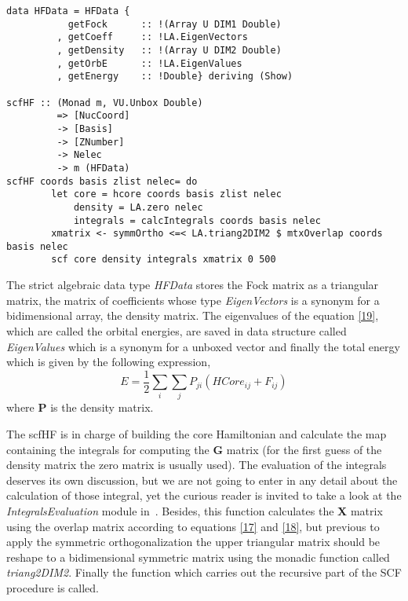 \documentclass{tmr}
\begin{document}
\begin{lstlisting}[float,captionpos=b,belowcaptionskip=4pt, caption= The Interface function]
data HFData = HFData {
           getFock      :: !(Array U DIM1 Double)
         , getCoeff     :: !LA.EigenVectors 
         , getDensity   :: !(Array U DIM2 Double)
         , getOrbE      :: !LA.EigenValues
         , getEnergy    :: !Double} deriving (Show)

scfHF :: (Monad m, VU.Unbox Double)
         => [NucCoord] 
         -> [Basis]
         -> [ZNumber]
         -> Nelec
         -> m (HFData)
scfHF coords basis zlist nelec= do 
        let core = hcore coords basis zlist nelec
            density = LA.zero nelec
            integrals = calcIntegrals coords basis nelec           
        xmatrix <- symmOrtho <=< LA.triang2DIM2 $ mtxOverlap coords basis nelec
        scf core density integrals xmatrix 0 500

\end{lstlisting}

The strict algebraic data type \textit{HFData} stores the Fock matrix as a triangular matrix, 
the matrix of coefficients whose type \textit{EigenVectors} is a synonym for a bidimensional array,
 the density matrix. The eigenvalues of the equation \eqref{19}, which are called the orbital energies,
 are saved in data structure called 
\textit{EigenValues} which is a synonym for a unboxed vector and finally 
the total energy which is given by the following expression,
\begin{equation}\label{28}
E = \frac{1}{2} \sum_{i}\sum_{j} P_{ji}(HCore_{ij} + F_{ij})
\end{equation}
where \textbf{P} is the density matrix.

The scfHF is in charge of building the core Hamiltonian and calculate the map containing
the integrals for computing the \textbf{G} matrix (for the first guess of 
the density matrix the zero matrix is usually used). The evaluation of the integrals 
deserves its own discussion, but we are not going to enter in any detail 
about the calculation of those integral, yet the curious reader is 
invited to take a look at the \textit{IntegralsEvaluation}
module in~\cite{AngelyFelipe}. Besides, this function calculates the 
\textbf{X} matrix using the overlap matrix according to equations \eqref{17}
and \eqref{18}, but previous to apply the symmetric orthogonalization the upper triangular matrix
should be reshape to a bidimensional symmetric matrix using the monadic function
called \textit{triang2DIM2}. Finally the function which carries out the recursive part of
the SCF procedure is called. 
\end{document}
